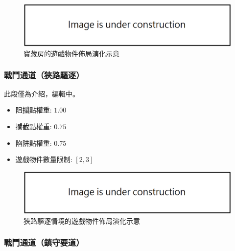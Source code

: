 \begin{figure}[ht]
  \begin{center}
    \includegraphics[width=1.0\textwidth]{figures/under_construction.png}
    \caption{寶藏房的遊戲物件佈局演化示意} 
    \label{fig:applied-ga-on-volume-treasure}
  \end{center}
\end{figure}

\subsubsection{戰鬥通道（狹路驅逐）}
\label{sssec:method-segments-appliedonvolumes-battlepath-narrow}

此段僅為介紹，編輯中。

\begin{itemize}
  \setlength\itemsep{-0.5em}
  \item 阻攔點權重: $1.00$
  \item 攔截點權重: $0.75$
  \item 陷阱點權重: $0.75$
  \item 遊戲物件數量限制: $[2, 3]$
\end{itemize}

\begin{figure}[ht]
  \begin{center}
    \includegraphics[width=1.0\textwidth]{figures/under_construction.png}
    \caption{狹路驅逐情境的遊戲物件佈局演化示意} 
    \label{fig:applied-ga-on-volume-battlepath-narrow}
  \end{center}
\end{figure}

\subsubsection{戰鬥通道（鎮守要道）}
\label{sssec:method-segments-appliedonvolumes-battlepath-trunk}

